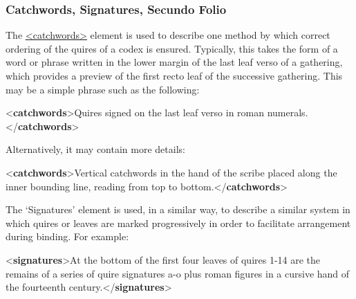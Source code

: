 \subsubsection[{Catchwords, Signatures, Secundo Folio}]{Catchwords, Signatures, Secundo Folio}\label{msmisc}\par
The \hyperref[TEI.catchwords]{<catchwords>} element is used to describe one method by which correct ordering of the quires of a codex is ensured. Typically, this takes the form of a word or phrase written in the lower margin of the last leaf verso of a gathering, which provides a preview of the first recto leaf of the successive gathering. This may be a simple phrase such as the following: \par\bgroup{}\exampleFont \begin{shaded}\noindent\mbox{}{<\textbf{catchwords}>}Quires signed on the\mbox{}\newline 
 last leaf verso in roman numerals.{</\textbf{catchwords}>}\end{shaded}\egroup\par \noindent  Alternatively, it may contain more details: \par\bgroup{}\exampleFont \begin{shaded}\noindent\mbox{}{<\textbf{catchwords}>}Vertical catchwords in the hand of the scribe placed along the inner\mbox{}\newline 
 bounding line, reading from top to bottom.{</\textbf{catchwords}>}\end{shaded}\egroup\par \par
The ‘Signatures’ element is used, in a similar way, to describe a similar system in which quires or leaves are marked progressively in order to facilitate arrangement during binding. For example: \par\bgroup{}\exampleFont \begin{shaded}\noindent\mbox{}{<\textbf{signatures}>}At the bottom of the\mbox{}\newline 
 first four leaves of quires 1-14 are the remains of a series of quire signatures\mbox{}\newline 
 a-o plus roman figures in a cursive hand of the fourteenth century.{</\textbf{signatures}>}\end{shaded}\egroup\par \par
